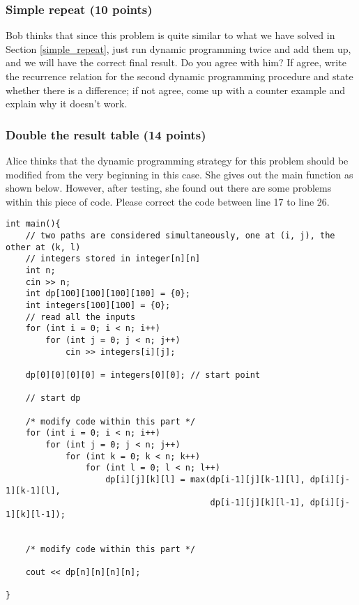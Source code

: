 \documentclass[11pt]{exam}
\begin{document}
\subsubsection{Simple repeat (10 points)}
Bob thinks that since this problem is quite similar to what we have solved in Section \ref{simple_repeat}, just run dynamic programming twice and add them up, and we will have the correct final result. Do you agree with him? If agree, write the recurrence relation for the second dynamic programming procedure and state whether there is a difference; if not agree, come up with a counter example and explain why it doesn't work.
\begin{solution}
\end{solution}
\subsubsection{Double the result table (14 points)}
Alice thinks that the dynamic programming strategy for this problem should be modified from the very beginning in this case. She gives out the main function as shown below. However, after testing, she found out there are some problems within this piece of code. Please correct the code between line 17 to line 26.
\newpage 
\begin{lstlisting}
int main(){
    // two paths are considered simultaneously, one at (i, j), the other at (k, l)
    // integers stored in integer[n][n]
    int n;
    cin >> n;
    int dp[100][100][100][100] = {0};
    int integers[100][100] = {0};
    // read all the inputs
    for (int i = 0; i < n; i++)
        for (int j = 0; j < n; j++)
            cin >> integers[i][j];
    
    dp[0][0][0][0] = integers[0][0]; // start point
    
    // start dp
    
    /* modify code within this part */
    for (int i = 0; i < n; i++)
        for (int j = 0; j < n; j++)
            for (int k = 0; k < n; k++)
                for (int l = 0; l < n; l++)
                    dp[i][j][k][l] = max(dp[i-1][j][k-1][l], dp[i][j-1][k-1][l],
                                         dp[i-1][j][k][l-1], dp[i][j-1][k][l-1]);
                                         
                                         
    /* modify code within this part */
    
    cout << dp[n][n][n][n];
    
}
\end{lstlisting}
\end{document}
